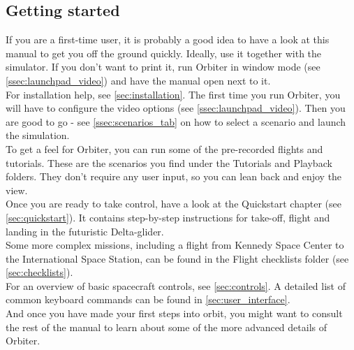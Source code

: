 \documentclass[Orbiter User Manual.tex]{subfiles}
\begin{document}
\subsection{Getting started}
If you are a first-time user, it is probably a good idea to have a look at this manual to get you off the ground quickly. Ideally, use it together with the simulator. If you don't want to print it, run Orbiter in window mode (see \ref{ssec:launchpad_video}) and have the manual open next to it.\\
For installation help, see \ref{sec:installation}. The first time you run Orbiter, you will have to configure the video options (see \ref{ssec:launchpad_video}). Then you are good to go - see \ref{ssec:scenarios_tab} on how to select a scenario and launch the simulation.\\
To get a feel for Orbiter, you can run some of the pre-recorded flights and tutorials. These are the scenarios you find under the Tutorials and Playback folders. They don't require any user input, so you can lean back and enjoy the view.\\
Once you are ready to take control, have a look at the Quickstart chapter (see \ref{sec:quickstart}). It contains step-by-step instructions for take-off, flight and landing in the futuristic Delta-glider.\\
Some more complex missions, including a flight from Kennedy Space Center to the International Space Station, can be found in the Flight checklists folder (see \ref{sec:checklists}).\\
For an overview of basic spacecraft controls, see \ref{sec:controls}. A detailed list of common keyboard commands can be found in \ref{sec:user_interface}.\\
And once you have made your first steps into orbit, you might want to consult the rest of the manual to learn about some of the more advanced details of Orbiter.
\end{document}
